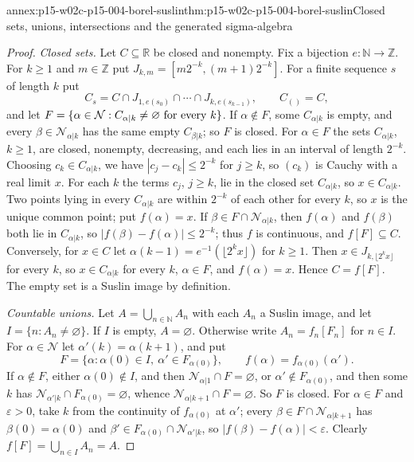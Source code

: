\begin{annexitem}{annex:p15-w02c-p15-004-borel-suslin}{thm:p15-w02c-p15-004-borel-suslin}{Closed sets, unions, intersections and the generated sigma-algebra}
\begin{proof}
\emph{Closed sets.} Let \(C\subseteq\mathbb R\) be closed and nonempty.
Fix a bijection \(e:\mathbb N\to\mathbb Z\). For \(k\geq1\) and
\(m\in\mathbb Z\) put \(J_{k,m}=[m2^{-k},(m+1)2^{-k}]\). For a finite
sequence \(s\) of length \(k\) put
\[
 C_s=C\cap J_{1,e(s_0)}\cap\cdots\cap J_{k,e(s_{k-1})},
 \qquad C_{()}=C,
\]
and let \(F=\{\alpha\in\mathcal N:C_{\alpha|k}\neq\varnothing
\hbox{ for every }k\}\). If \(\alpha\notin F\), some
\(C_{\alpha|k}\) is empty, and every \(\beta\in\mathcal N_{\alpha|k}\)
has the same empty \(C_{\beta|k}\); so \(F\) is closed.
For \(\alpha\in F\) the sets \(C_{\alpha|k}\), \(k\geq1\), are closed,
nonempty, decreasing, and each lies in an interval of length \(2^{-k}\).
Choosing \(c_k\in C_{\alpha|k}\), we have \(|c_j-c_k|\leq2^{-k}\) for
\(j\geq k\), so \((c_k)\) is Cauchy with a real limit \(x\). For each
\(k\) the terms \(c_j\), \(j\geq k\), lie in the closed set
\(C_{\alpha|k}\), so \(x\in C_{\alpha|k}\). Two points lying in every
\(C_{\alpha|k}\) are within \(2^{-k}\) of each other for every \(k\), so
\(x\) is the unique common point; put \(f(\alpha)=x\). If
\(\beta\in F\cap\mathcal N_{\alpha|k}\), then \(f(\alpha)\) and
\(f(\beta)\) both lie in \(C_{\alpha|k}\), so
\(|f(\beta)-f(\alpha)|\leq2^{-k}\); thus \(f\) is continuous, and
\(f[F]\subseteq C\). Conversely, for \(x\in C\) let
\(\alpha(k-1)=e^{-1}(\lfloor2^kx\rfloor)\) for \(k\geq1\). Then
\(x\in J_{k,\lfloor2^kx\rfloor}\) for every \(k\), so
\(x\in C_{\alpha|k}\) for every \(k\), \(\alpha\in F\), and
\(f(\alpha)=x\). Hence \(C=f[F]\). The empty set is a Suslin image by
definition.

\emph{Countable unions.} Let \(A=\bigcup_{n\in\mathbb N}A_n\) with each
\(A_n\) a Suslin image, and let \(I=\{n:A_n\neq\varnothing\}\). If \(I\)
is empty, \(A=\varnothing\). Otherwise write \(A_n=f_n[F_n]\) for
\(n\in I\). For \(\alpha\in\mathcal N\) let \(\alpha'(k)=\alpha(k+1)\), and
put
\[
 F=\{\alpha:\alpha(0)\in I,\ \alpha'\in F_{\alpha(0)}\},\qquad
 f(\alpha)=f_{\alpha(0)}(\alpha').
\]
If \(\alpha\notin F\), either \(\alpha(0)\notin I\), and then
\(\mathcal N_{\alpha|1}\cap F=\varnothing\), or
\(\alpha'\notin F_{\alpha(0)}\), and then some \(k\) has
\(\mathcal N_{\alpha'|k}\cap F_{\alpha(0)}=\varnothing\), whence
\(\mathcal N_{\alpha|k+1}\cap F=\varnothing\). So \(F\) is closed. For
\(\alpha\in F\) and \(\varepsilon>0\), take \(k\) from the continuity of
\(f_{\alpha(0)}\) at \(\alpha'\); every
\(\beta\in F\cap\mathcal N_{\alpha|k+1}\) has \(\beta(0)=\alpha(0)\) and
\(\beta'\in F_{\alpha(0)}\cap\mathcal N_{\alpha'|k}\), so
\(|f(\beta)-f(\alpha)|<\varepsilon\). Clearly
\(f[F]=\bigcup_{n\in I}A_n=A\).


\end{proof}
\end{annexitem}
